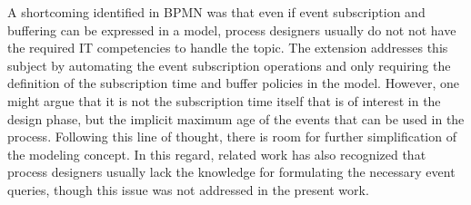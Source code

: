 A shortcoming identified in BPMN was that even if event subscription and buffering can be expressed in a model, process designers usually do not not have the required IT competencies to handle the topic.
The extension addresses this subject by automating the event subscription operations and only requiring the definition of the subscription time and buffer policies in the model.
However, one might argue that it is not the subscription time itself that is of interest in the design phase, but the implicit maximum age of the events that can be used in the process. Following this line of thought, there is room for further simplification of the modeling concept.
In this regard, related work has also recognized that process designers usually lack the knowledge for formulating the necessary event queries, though this issue was not addressed in the present work.










